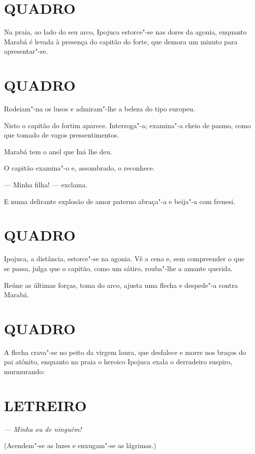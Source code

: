 \section*{QUADRO}

Na praia, ao lado do seu arco, Ipojuca estorce"-se nas dores da agonia,
enquanto Marabá é levada à presença do capitão do forte, que demora um
minuto para apresentar"-se.

\section*{QUADRO}

Rodeiam"-na os lusos e admiram"-lhe a beleza do tipo europeu.

Nisto o capitão do fortim aparece. Interroga"-a; examina"-a cheio de
pasmo, como que tomado de vagos pressentimentos.

Marabá tem o anel que Iná lhe deu.

O capitão examina"-o e, assombrado, o reconhece.

--- Minha filha! --- exclama.

E numa delirante explosão de amor paterno abraça"-a e beija"-a com
frenesi.

\section*{QUADRO}

Ipojuca, a distância, estorce"-se na agonia. Vê a cena e, sem compreender
o que se passa, julga que o capitão, como um sátiro, rouba"-lhe a amante
querida.

Reúne as últimas forças, toma do arco, ajusta uma flecha e despede"-a
contra Marabá.

\section*{QUADRO}

A flecha crava"-se no peito da virgem loura, que desfalece e morre nos
braços do pai atônito, enquanto na praia o heroico Ipojuca exala o
derradeiro suspiro, murmurando:

\section*{LETREIRO}

\emph{--- Minha ou de ninguém!}

(Acendem"-se as luzes e enxugam"-se as lágrimas.)

